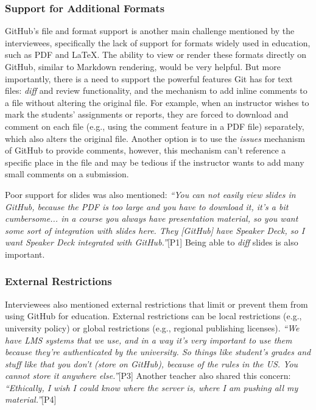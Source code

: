\subsubsection{Support for Additional Formats}
GitHub's file and format support is another main challenge mentioned by the interviewees, specifically the lack of support for formats widely used in education, such as PDF and LaTeX. The ability to view or render these formats directly on GitHub, similar to Markdown rendering, would be very helpful. But more importantly, there is a need to support the powerful features Git has for text files: \textit{diff} and review functionality, and the mechanism to add inline comments to a file without altering the original file. For example, when an instructor wishes to mark the students' assignments or reports, they are forced to download and comment on each file (e.g., using the comment feature in a PDF file) separately, which also alters the original file. Another option is to use the \textit{issues} mechanism of GitHub to provide comments, however, this mechanism can't reference a specific place in the file and may be tedious if the instructor wants to add many small comments on a submission.

Poor support for slides was also mentioned: \textit{``You can not easily view slides in GitHub, because the PDF is too large and you have to download it, it's a bit cumbersome... in a course you always have presentation material, so you want some sort of integration with slides here. They [GitHub] have Speaker Deck, so I want Speaker Deck integrated with GitHub.''}[P1] Being able to \textit{diff} slides is also important.

\subsubsection{External Restrictions}
Interviewees also mentioned external restrictions that limit or prevent them from using GitHub for education. External restrictions can be local restrictions (e.g., university policy) or global restrictions (e.g., regional publishing licenses). \textit{``We have LMS systems that we use, and in a way it's very important to use them because they're authenticated by the university. So things like student's grades and stuff like that you don't (store on GitHub), because of the rules in the US. You cannot store it anywhere else.''}[P3]
Another teacher also shared this concern:
\textit{``Ethically, I wish I could know where the server is, where I am pushing all my material.''}[P4]

